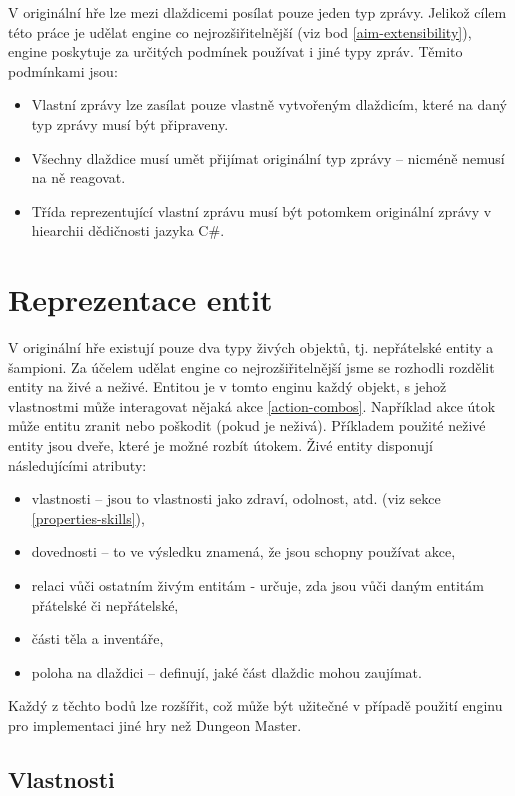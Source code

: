 V originální hře lze mezi dlaždicemi posílat pouze jeden typ zprávy. Jelikož cílem této práce je udělat engine
co nejrozšiřitelnější  (viz bod \ref{aim-extensibility}), engine poskytuje za určitých podmínek používat i jiné typy zpráv.
Těmito podmínkami jsou:
\begin{itemize}
\item Vlastní zprávy lze zasílat pouze vlastně vytvořeným dlaždicím, které na daný typ zprávy musí být připraveny.
\item Všechny dlaždice musí umět přijímat originální typ zprávy -- nicméně nemusí na ně reagovat.
\item Třída reprezentující vlastní zprávu musí být potomkem originální zprávy v hiearchii dědičnosti jazyka C\#.
\end{itemize}

\section{Reprezentace entit}

V originální hře existují pouze dva typy živých objektů, tj. nepřátelské entity a šampioni. Za účelem udělat engine
co nejrozšiřitelnější  jsme se rozhodli rozdělit entity na živé a neživé.   
Entitou je v tomto enginu každý objekt, s jehož vlastnostmi může interagovat nějaká akce \vref{action-combos}.
Například akce útok může entitu zranit nebo poškodit  (pokud je neživá). Příkladem použité neživé entity 
jsou dveře, které je možné rozbít útokem. Živé entity disponují následujícími atributy:

\begin{itemize}
\item vlastnosti -- jsou to vlastnosti jako zdraví, odolnost,  atd.  (viz sekce \ref{properties-skills}),
\item dovednosti -- to ve výsledku znamená, že jsou schopny používat akce,
\item relaci vůči ostatním živým entitám - určuje, zda jsou vůči daným entitám přátelské či nepřátelské,
\item části těla a inventáře,
\item poloha na dlaždici -- definují, jaké část dlaždic mohou zaujímat.
\end{itemize}

Každý z těchto bodů lze rozšířit, což může být užitečné v případě použití enginu pro implementaci jiné hry než Dungeon Master. 

\subsection{Vlastnosti}\label{entity-properties}

